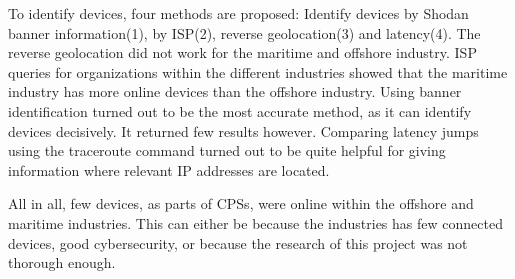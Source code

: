 To identify devices, four methods are proposed: Identify devices by Shodan banner information(1), by ISP(2), reverse geolocation(3) and latency(4).
The reverse geolocation did not work for the maritime and offshore industry. 
ISP queries for organizations within the different industries showed that the maritime industry has more online devices than the offshore industry. 
Using banner identification turned out to be the most accurate method, as it can identify devices decisively. It returned few results however.
Comparing latency jumps using the traceroute command turned out to be quite helpful for giving information where relevant IP addresses are located.

All in all, few devices, as parts of CPSs, were online within the offshore and maritime industries. This can either be because the industries has few connected devices, good cybersecurity, or because the research of this project was not thorough enough.

\newpage
